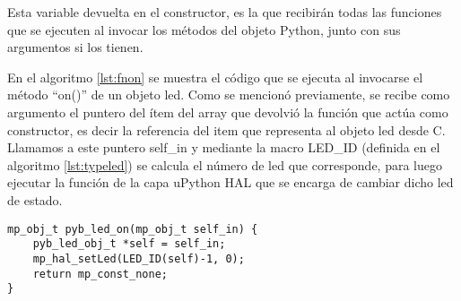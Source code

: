 Esta variable devuelta en el constructor, es la que recibirán todas las funciones que se ejecuten al invocar los métodos del objeto Python, junto con sus argumentos si los tienen.

En el algoritmo \ref{lst:fnon} se muestra el código que se ejecuta al invocarse el método “on()” de un objeto led. Como se mencionó previamente, se recibe como argumento el puntero del ítem del array que devolvió la función que actúa como constructor, es decir la referencia del item que representa al objeto led desde C. Llamamos a este puntero self\_in y mediante la macro LED\_ID (definida en el algoritmo \ref{lst:typeled}) se calcula el número de led que corresponde, para luego ejecutar la función de la capa uPython HAL que se encarga de cambiar dicho led de estado.

\begin{lstlisting}[label={lst:fnon},caption=Definición de la función que se ejecuta al invocar el método on().] 
mp_obj_t pyb_led_on(mp_obj_t self_in) {
    pyb_led_obj_t *self = self_in;
    mp_hal_setLed(LED_ID(self)-1, 0);
    return mp_const_none;
}
\end{lstlisting}







